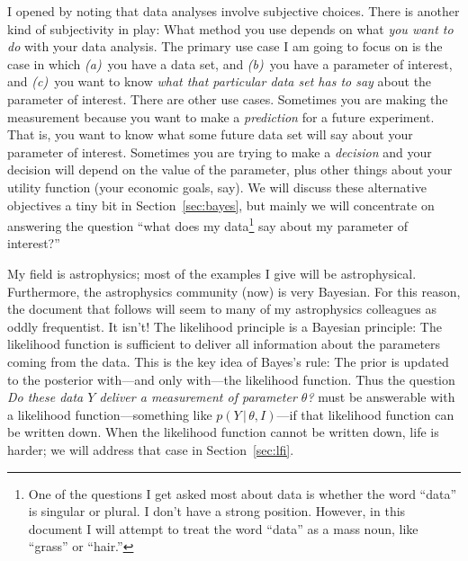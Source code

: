 \documentclass{article}
\newcommand{\sectionname}{Section}
\newcommand{\secref}[1]{\sectionname~\ref{#1}}
\newcommand{\given}{\,|\,}
\begin{document}
I opened by noting that data analyses involve subjective choices.
There is another kind of subjectivity in play:
What method you use depends on what \emph{you want to do} with your data analysis.
The primary use case I am going to focus on is the case in which
\textsl{(a)}~you have a data set, and
\textsl{(b)}~you have a parameter of interest,
and \textsl{(c)}~you want to know \emph{what that particular data set has to say} about the parameter of interest.
There are other use cases.
Sometimes you are making the measurement because you want to make a \emph{prediction} for a future experiment.
That is, you want to know what some future data set will say about your parameter of interest.
Sometimes you are trying to make a \emph{decision} and your decision will depend on the value of the parameter, plus other things about your utility function (your economic goals, say).
We will discuss these alternative objectives a tiny bit in \secref{sec:bayes}, but mainly we will concentrate on answering the question ``what does my data\footnote{%
One of the questions I get asked most about data is whether the word ``data'' is singular or plural. I don't have a strong position. However, in this document I will attempt to treat the word ``data'' as a mass noun, like ``grass'' or ``hair.''}
say about my parameter of interest?''

My field is astrophysics; most of the examples I give will be astrophysical.
Furthermore, the astrophysics community (now) is very Bayesian.
For this reason, the document that follows will seem to many of my astrophysics colleagues as oddly frequentist.
It isn't!
The likelihood principle is a Bayesian principle:
The likelihood function is sufficient to deliver all information about the parameters coming from the data.
This is the key idea of Bayes's rule:
The prior is updated to the posterior with---and only with---the likelihood function.
Thus the question \emph{Do these data $Y$ deliver a measurement of parameter $\theta$?} must be answerable with a likelihood function---something like $p(Y\given\theta,I)$---if that likelihood function can be written down.
When the likelihood function cannot be written down, life is harder; we will address that case in \secref{sec:lfi}.
\end{document}
